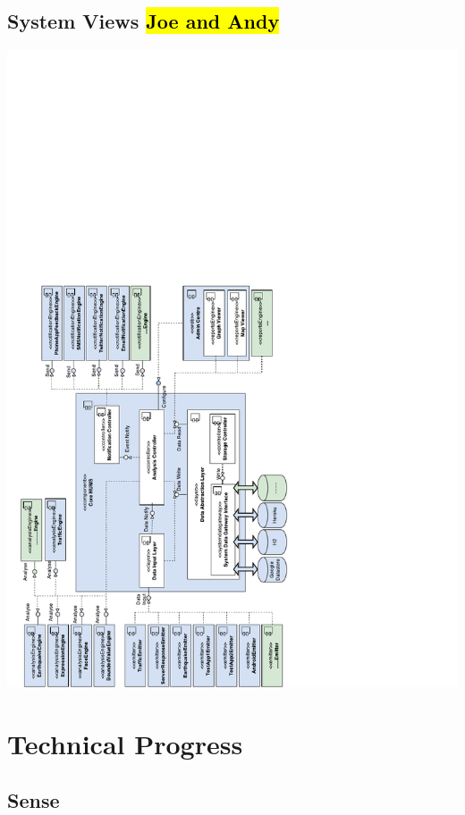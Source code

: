 \documentclass[10pt,a4paper]{article}
\begin{document}
\subsection{System Views \hl{Joe and Andy}} 
\label{sec:views}
\includegraphics[width=\textwidth]{images/component.pdf}
\section{Technical Progress}
\label{sec:techprog}

\subsection{Sense}
\label{sec:sense}
\end{document}
